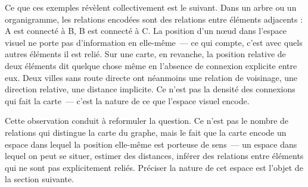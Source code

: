 Ce que ces exemples révèlent collectivement est le suivant. Dans un arbre ou un organigramme,
les relations encodées sont des relations entre éléments adjacents : A est
connecté à B, B est connecté à C. La position d'un n\oe{}ud dans l'espace visuel
ne porte pas d'information en elle-même~--- ce qui compte, c'est avec quels
autres éléments il est relié. Sur une carte, en revanche, la position relative de
deux éléments dit quelque chose même en l'absence de connexion explicite entre eux.
Deux villes sans route directe ont néanmoins une relation de voisinage, une direction
relative, une distance implicite. Ce n'est pas la densité des connexions qui fait
la carte~--- c'est la nature de ce que l'espace visuel encode.

Cette observation conduit à reformuler la question. Ce n'est pas le nombre de
relations qui distingue la carte du graphe, mais le fait que la carte encode un espace
dans lequel la position elle-même est porteuse de sens~--- un espace dans lequel
on peut se situer, estimer des distances, inférer des relations entre éléments qui
ne sont pas explicitement reliés. Préciser la nature de cet espace est l'objet
de la section suivante.